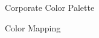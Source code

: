 
\begin{frame}{Corporate Color Palette}
    \centering
    \vspace{1em}
    
\end{frame}


\begin{frame}{Color Mapping}
    
\end{frame}
